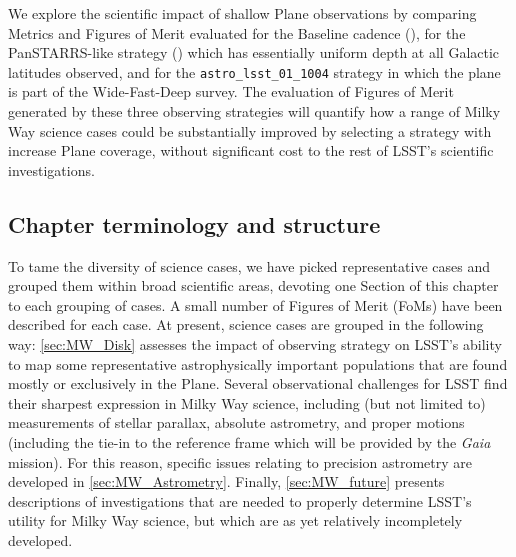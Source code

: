 
We explore the scientific
impact of shallow Plane observations by comparing Metrics and Figures of
Merit evaluated for the Baseline cadence (),
for the PanSTARRS-like strategy () which has
essentially uniform depth at all Galactic latitudes observed, and for
the {\tt astro\_lsst\_01\_1004} strategy in which the plane is part of
the Wide-Fast-Deep survey. The evaluation of
Figures of Merit generated by these three observing strategies will
quantify how a range of Milky Way science cases could be
substantially improved by selecting a strategy with increase Plane
coverage, without significant cost to the rest of LSST's scientific
investigations.


\subsection{Chapter terminology and structure}

To tame the diversity of science cases, we have picked
representative cases and grouped them within broad scientific areas,
devoting one Section of this chapter to each grouping of cases. A small
number of Figures of Merit (FoMs) have been described for each case. 
At present, science cases are grouped in the following way:
\autoref{sec:MW_Disk} assesses the impact of observing strategy on
LSST's ability to map some representative astrophysically important
populations that are found mostly or exclusively in the Plane.
Several observational challenges for LSST find their
sharpest expression in Milky Way science, including (but not limited to)
measurements of stellar parallax, absolute astrometry, and proper
motions (including the tie-in to the reference frame which will be
provided by the \textit{Gaia} mission). For this reason, specific issues
relating to precision astrometry are developed in
\autoref{sec:MW_Astrometry}.
Finally, \autoref{sec:MW_future}
presents descriptions of investigations that are needed to properly
determine LSST's utility for Milky Way science, but which
are as yet relatively incompletely developed.

